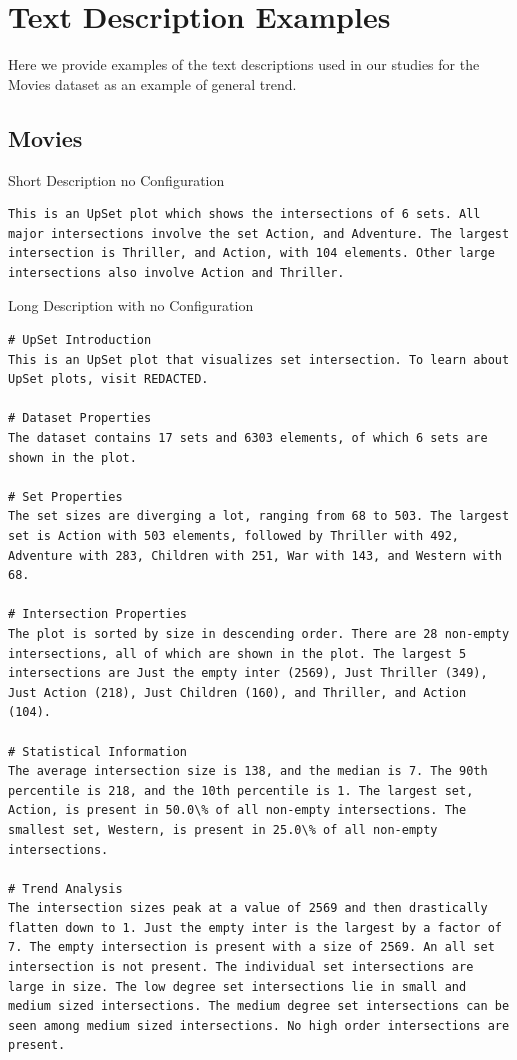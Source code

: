 \documentclass{egpubl}
\begin{document}
\normalsize
\section{Text Description Examples}
\label{sec:text-descriptions}

Here we provide examples of the text descriptions used in our studies for the Movies dataset as an example of general trend.

\subsection{Movies}

Short Description no Configuration

\small
\begin{lstlisting}
This is an UpSet plot which shows the intersections of 6 sets. All major intersections involve the set Action, and Adventure. The largest intersection is Thriller, and Action, with 104 elements. Other large intersections also involve Action and Thriller. 
\end{lstlisting}
\normalsize


\noindent{}Long Description with no Configuration

\small
\begin{lstlisting}
# UpSet Introduction
This is an UpSet plot that visualizes set intersection. To learn about UpSet plots, visit REDACTED.

# Dataset Properties
The dataset contains 17 sets and 6303 elements, of which 6 sets are shown in the plot.

# Set Properties
The set sizes are diverging a lot, ranging from 68 to 503. The largest set is Action with 503 elements, followed by Thriller with 492, Adventure with 283, Children with 251, War with 143, and Western with 68.

# Intersection Properties
The plot is sorted by size in descending order. There are 28 non-empty intersections, all of which are shown in the plot. The largest 5 intersections are Just the empty inter (2569), Just Thriller (349), Just Action (218), Just Children (160), and Thriller, and Action (104).

# Statistical Information
The average intersection size is 138, and the median is 7. The 90th percentile is 218, and the 10th percentile is 1. The largest set, Action, is present in 50.0\% of all non-empty intersections. The smallest set, Western, is present in 25.0\% of all non-empty intersections.

# Trend Analysis
The intersection sizes peak at a value of 2569 and then drastically flatten down to 1. Just the empty inter is the largest by a factor of 7. The empty intersection is present with a size of 2569. An all set intersection is not present. The individual set intersections are large in size. The low degree set intersections lie in small and medium sized intersections. The medium degree set intersections can be seen among medium sized intersections. No high order intersections are present.

\end{lstlisting}
\normalsize
\end{document}
